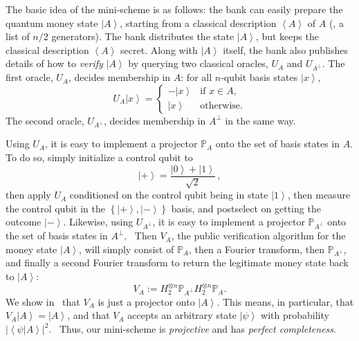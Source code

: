 The basic idea of the mini-scheme is as follows: the bank can easily prepare
the quantum money state $\left\vert A\right\rangle $, starting from a
classical description $\left\langle A\right\rangle $ of $A$ (\eg, a list of
$n/2$ generators). The bank distributes the state $\left\vert
A\right\rangle $, but keeps the classical description $\left\langle
A\right\rangle $ secret. Along with $\left\vert A\right\rangle $ itself,
the bank also publishes details of how to \emph{verify} $\left\vert
A\right\rangle $ by querying two classical oracles, $U_{A}$ and $U_{A^{\bot}%
}$. The first oracle, $U_{A}$, decides membership in $A$: for all $n$-qubit
basis states $\left\vert x\right\rangle $,%
\[
U_{A}\left\vert x\right\rangle =
\begin{cases}
-\left\vert x\right\rangle  & \text{if $x\in A$,}\\
\left\vert x\right\rangle  & \text{otherwise.}%
\end{cases}
\]
The second oracle, $U_{A^{\bot}}$, decides membership in $A^{\bot}$ in the
same way.

Using $U_{A}$, it is easy to implement a projector $\mathbb{P}_{A}$ onto the
set of basis states in $A$. To do so, simply initialize a control qubit to
\[
\left\vert +\right\rangle =\frac{\left\vert 0\right\rangle +\left\vert
1\right\rangle }{\sqrt{2}}\,,
\]
then apply $U_{A}$ conditioned on the control
qubit being in state $\left\vert 1\right\rangle $, then measure the control
qubit in the $\left\{  \left\vert +\right\rangle ,\left\vert -\right\rangle
\right\}  $ basis, and postselect on getting the outcome $\left\vert
-\right\rangle $. Likewise, using $U_{A^{\bot}}$, it is easy to implement a
projector $\mathbb{P}_{A^{\bot}}$ onto the set of basis states in $A^{\bot}$.
\ Then $V_{A}$, the public verification algorithm for the money state
$\left\vert A\right\rangle $, will simply consist of $\mathbb{P}_{A}$, then a
Fourier transform, then $\mathbb{P}_{A^{\bot}}$, and finally a second Fourier
transform to return the legitimate money state back to $\left\vert
A\right\rangle $:%
\[
V_{A}:=H_{2}^{\otimes n}\mathbb{P}_{A^{\bot}}H_{2}^{\otimes n}\mathbb{P}_{A}.
\]
We show in \ that $V_{A}$ is just a projector onto
$\left\vert A\right\rangle $. This means, in particular, that $V_{A}%
\left\vert A\right\rangle =\left\vert A\right\rangle $, and that $V_{A}%
$ accepts an arbitrary state $\left\vert \psi\right\rangle $ with
probability $\left\vert \left\langle \psi|A\right\rangle \right\vert ^{2}$.
\ Thus, our mini-scheme is \emph{projective} and has \emph{perfect
completeness}.

